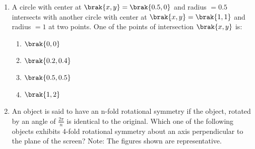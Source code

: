 \documentclass[journal,12pt,onecolumn]{IEEEtran}
\theoremstyle{remark}
\begin{document}
\begin{enumerate}
\begin{enumerate}
		\end{enumerate}
		
		\item A circle with center at $\brak{x,y}=\brak{0.5,0}$ and radius $=0.5$ intersects with another circle with center at $\brak{x,y}=\brak{1,1}$ and radius $=1$ at two points. One of the points of intersection $\brak{x, y}$ is:
		
		\hfill{}
		
		\begin{multicols}{2}
			\begin{enumerate}
				\item $\brak{0,0}$
				\item $\brak{0.2, 0.4}$
				\item $\brak{0.5, 0.5}$
				\item $\brak{1,2}$
			\end{enumerate}
		\end{multicols}
		
		\item An object is said to have an n-fold rotational symmetry if the object, rotated by an angle of $\frac{2\pi}{n}$ is identical to the original. Which one of the following objects exhibits 4-fold rotational symmetry about an axis perpendicular to the plane of the screen? Note: The figures shown are representative.
		
		\hfill{}
		

\end{enumerate}
\end{document}
